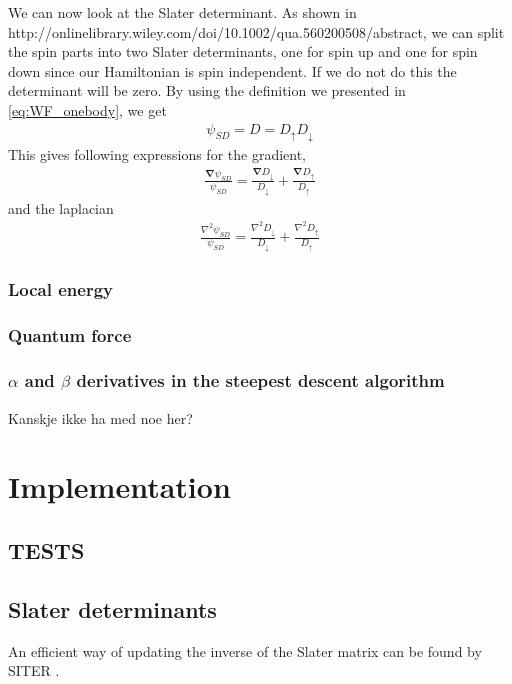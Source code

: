 \documentclass[11pt]{article}
\newcommand{\husk}[1]{\color{red} #1 \color{black}}
\begin{document}
We can now look at the Slater determinant. As shown in http://onlinelibrary.wiley.com/doi/10.1002/qua.560200508/abstract, we can split the spin parts into two Slater determinants, one for spin up and one for spin down since our Hamiltonian is spin independent. If we do not do this the determinant will be zero. By using the definition we presented in \eqref{eq:WF_onebody}, we get
\begin{align}
	\psi_{SD} = D = D_{\uparrow}D_{\downarrow}
	\label{eq:slater-det-spin-up-down}
\end{align}
This gives following expressions for the gradient,
\begin{align}
	\frac{\bm{\nabla}\psi_{SD}}{\psi_{SD}} = \frac{\bm{\nabla}D_{\downarrow}}{D_{\downarrow}} + \frac{\bm{\nabla}D_{\uparrow}}{D_{\uparrow}}
	\label{eq:slater-spin-down-up-grad}
\end{align}
and the laplacian
\begin{align}
	\frac{{\nabla}^2\psi_{SD}}{\psi_{SD}} = \frac{{\nabla}^2D_{\downarrow}}{D_{\downarrow}} + \frac{{\nabla}^2D_{\uparrow}}{D_{\uparrow}}
	\label{eq:slater-spin-down-up-lap}
\end{align}



\subsubsection{Local energy}

\subsubsection{Quantum force}

\subsubsection{\texorpdfstring{$\alpha$}{a} and \texorpdfstring{$\beta$}{b} derivatives in the steepest descent algorithm}
\husk{Kanskje ikke ha med noe her?}


\section{Implementation}

\subsection{TESTS}

\subsection{Slater determinants}
An efficient way of updating the inverse of the Slater matrix can be found by \husk{SITER}. 
\end{document}
